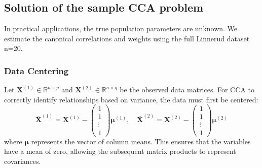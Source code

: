 \subsection{Solution of the sample CCA problem }
In practical applications, the true population parameters are unknown. We estimate the canonical correlations and weights using the full Linnerud dataset n=20.
\subsubsection{Data Centering}
 Let $\mathbf{X}^{(1)} \in \mathbb{R}^{n \times p}$ and $\mathbf{X}^{(2)} \in \mathbb{R}^{n \times q}$ be the observed data matrices. For CCA to correctly identify relationships based on variance, the data must first be centered:
\begin{equation}
\bar{\mathbf{X}}^{(1)} =
\mathbf{X}^{(1)} -
\begin{pmatrix}
1\\
1\\
\vdots\\
1
\end{pmatrix}
\boldsymbol{\mu}^{(1)},
\quad
\bar{\mathbf{X}}^{(2)} =
\mathbf{X}^{(2)} -
\begin{pmatrix}
1\\
1\\
\vdots\\
1
\end{pmatrix}
\boldsymbol{\mu}^{(2)}
\end{equation}
 where $\boldsymbol{\mu}$ represents the vector of column means. This ensures that the variables have a mean of zero, allowing the subsequent matrix products to represent covariances.
